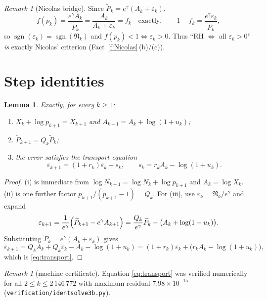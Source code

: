 \documentclass[11pt]{article}
\newtheorem{lemma}[theorem]{Lemma}
\theoremstyle{remark}
\newtheorem{remark}[theorem]{Remark}
\newcommand{\Nk}{N_k}
\newcommand{\Xk}{X_k}
\newcommand{\Ak}{A_k}
\newcommand{\uk}{u_k}
\newcommand{\rk}{r_k}
\newcommand{\eps}{\varepsilon}
\newcommand{\Nn}{\mathfrak{N}}
\newcommand{\Ptil}{\widetilde P}
\newcommand{\gam}{\gamma}
\DeclareMathOperator{\sgn}{sgn}
\begin{document}
\begin{remark}[Nicolas bridge]\label{rem:bridge}
Since $\Ptil_k=e^\gam(\Ak+\eps_k)$,
\[
f(p_k)=\frac{e^\gam\Ak}{\Ptil_k}=\frac{\Ak}{\Ak+\eps_k}=f_k
\quad\text{exactly},\qquad
1-f_k=\frac{e^\gam\eps_k}{\Ptil_k},
\]
so $\sgn(\eps_k)=\sgn(\Nn_k)$ and $f(p_k)<1\iff \eps_k>0$. Thus
``RH $\iff$ all $\eps_k>0$'' \emph{is} exactly Nicolas' criterion
(Fact~\ref{f:Nicolas}\,(b)/(c)).
\end{remark}

\section{Step identities}\label{sec:steps}

\begin{lemma}\label{lem:steps}
Exactly, for every $k\ge1$:
\begin{enumerate}
\item $\Xk+\log p_{k+1}=X_{k+1}$ and $\displaystyle A_{k+1}=\Ak+\log(1+\uk)$;
\item $\Ptil_{k+1}=Q_k\Ptil_k$;
\item the error satisfies the \emph{transport equation}
\begin{equation}\label{eq:transport}
\eps_{k+1}=(1+\rk)\eps_k+s_k,
\qquad s_k=\rk \Ak-\log(1+\uk).
\tag{T}
\end{equation}
\end{enumerate}
\end{lemma}

\begin{proof}
(i) is immediate from $\log N_{k+1}=\log \Nk+\log p_{k+1}$ and $\Ak=\log\Xk$.
(ii) is one further factor $p_{k+1}/(p_{k+1}-1)=Q_k$.
For (iii), use $\eps_k=\Nn_k/e^\gam$ and expand
\[
\eps_{k+1}
=\frac{1}{e^\gam}\Bigl(\Ptil_{k+1}-e^\gam A_{k+1}\Bigr)
=\frac{Q_k}{e^\gam}\Ptil_k-\bigl(\Ak+\log(1+\uk)\bigr).
\]
Substituting $\Ptil_k=e^\gam(\Ak+\eps_k)$ gives
\[
\eps_{k+1}=Q_k\Ak+Q_k\eps_k-\Ak-\log(1+\uk)
=(1+\rk)\eps_k+\bigl(\rk\Ak-\log(1+\uk)\bigr),
\]
which is \eqref{eq:transport}.
\end{proof}

\begin{remark}[machine certificate]\label{rem:cert}
Equation \eqref{eq:transport} was verified numerically for all
$2\le k\le 2\,146\,772$ with maximum residual $7.98\times10^{-15}$
(\texttt{verification/identsolve3b.py}).
\end{remark}
\end{document}
